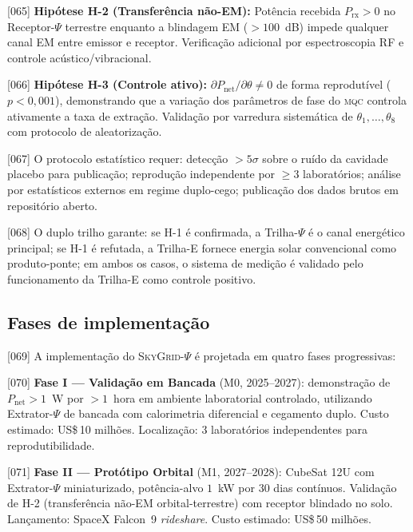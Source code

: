 \documentclass[12pt,a4paper]{article}
\newcommand{\Psifield}{\Psi}
\newcommand{\MQC}{\textsc{mqc}}
\newcommand{\SkyGrid}{\textsc{SkyGrid}-$\Psifield$}
\newcommand{\Pnet}{P_{\text{net}}}
\begin{document}
{[065]} \textbf{Hipótese H-2 (Transferência não-EM):} Potência recebida $P_{\text{rx}} > 0$ no Receptor-$\Psifield$ terrestre enquanto a blindagem EM ($> 100$~dB) impede qualquer canal EM entre emissor e receptor. Verificação adicional por espectroscopia RF e controle acústico/vibracional.

{[066]} \textbf{Hipótese H-3 (Controle ativo):} $\partial \Pnet / \partial \theta \neq 0$ de forma reprodutível ($p < 0{,}001$), demonstrando que a variação dos parâmetros de fase do \MQC{} controla ativamente a taxa de extração. Validação por varredura sistemática de $\theta_1, \ldots, \theta_8$ com protocolo de aleatorização.

{[067]} O protocolo estatístico requer: detecção $> 5\sigma$ sobre o ruído da cavidade placebo para publicação; reprodução independente por $\geq 3$ laboratórios; análise por estatísticos externos em regime duplo-cego; publicação dos dados brutos em repositório aberto.

{[068]} O duplo trilho garante: se H-1 é confirmada, a Trilha-$\Psifield$ é o canal energético principal; se H-1 é refutada, a Trilha-E fornece energia solar convencional como produto-ponte; em ambos os casos, o sistema de medição é validado pelo funcionamento da Trilha-E como controle positivo.

\subsection{Fases de implementação}
\label{sec:fases}

{[069]} A implementação do \SkyGrid{} é projetada em quatro fases progressivas:

{[070]} \textbf{Fase I --- Validação em Bancada} (M0, 2025--2027): demonstração de $\Pnet > 1$~W por $> 1$~hora em ambiente laboratorial controlado, utilizando Extrator-$\Psifield$ de bancada com calorimetria diferencial e cegamento duplo. Custo estimado: US\$\,10 milhões. Localização: $3$ laboratórios independentes para reprodutibilidade.

{[071]} \textbf{Fase II --- Protótipo Orbital} (M1, 2027--2028): CubeSat 12U com Extrator-$\Psifield$ miniaturizado, potência-alvo $1$~kW por $30$ dias contínuos. Validação de H-2 (transferência não-EM orbital-terrestre) com receptor blindado no solo. Lançamento: SpaceX Falcon~9 \textit{rideshare}. Custo estimado: US\$\,50 milhões.
\end{document}
